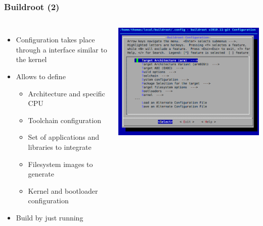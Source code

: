 \begin{frame}
  \frametitle{Buildroot (2)}
  \begin{columns}
    \begin{itemize}
    \item Configuration takes place through a  interface similar to the
      kernel\\
    \item Allows to define
      \begin{itemize}
      \item Architecture and specific CPU
      \item Toolchain configuration
      \item Set of applications and libraries to integrate
      \item Filesystem images to generate
      \item Kernel and bootloader configuration
      \end{itemize}
    \item Build by just running\\
    \end{itemize}
    \includegraphics[width=\textwidth]{slides/sysdev-embedded-linux/buildroot-screenshot.png}
  \end{columns}
\end{frame}

